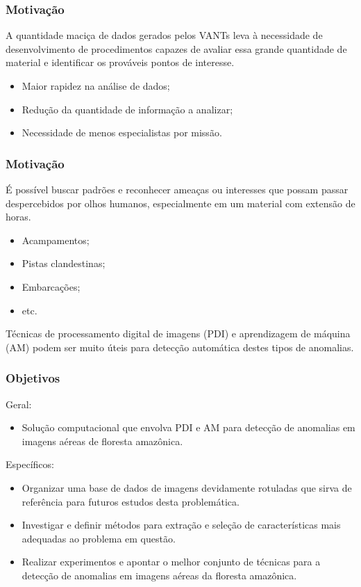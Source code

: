 \documentclass[t]{beamer}
\begin{document}
\begin{frame}
\frametitle{Motivação}

A quantidade maciça de dados gerados pelos VANTs leva à necessidade de desenvolvimento de procedimentos capazes de avaliar essa grande quantidade de material e identificar os prováveis pontos de interesse. 

\vspace{0.5cm}

\begin{itemize}
	\item Maior rapidez na análise de dados;
	\item Redução da quantidade de informação a analizar;
	\item Necessidade de menos especialistas por missão.
\end{itemize}

\end{frame}

\begin{frame}
\frametitle{Motivação}

É possível buscar padrões e reconhecer ameaças ou interesses que possam passar despercebidos por olhos humanos, especialmente em um material com extensão de horas. 

\begin{itemize}
	\item Acampamentos;
	\item Pistas clandestinas;
	\item Embarcações;
	\item etc.
\end{itemize}

Técnicas de processamento digital de imagens (PDI) e aprendizagem de máquina (AM) podem ser muito úteis para detecção automática destes tipos de anomalias.

\end{frame}

\begin{frame}
\frametitle{Objetivos}

Geral:

\begin{itemize}
	\item Solução computacional que envolva PDI e AM para detecção de anomalias em imagens aéreas de floresta amazônica.
\end{itemize}

Específicos:

\begin{itemize}
    \item Organizar uma base de dados de imagens devidamente rotuladas que sirva de referência para futuros estudos desta problemática.
    \item Investigar e definir métodos para extração e seleção de características mais adequadas ao problema em questão.
    \item Realizar experimentos e apontar o melhor conjunto de técnicas para a detecção de anomalias em imagens aéreas da floresta amazônica.
\end{itemize}

\end{frame}
\end{document}
